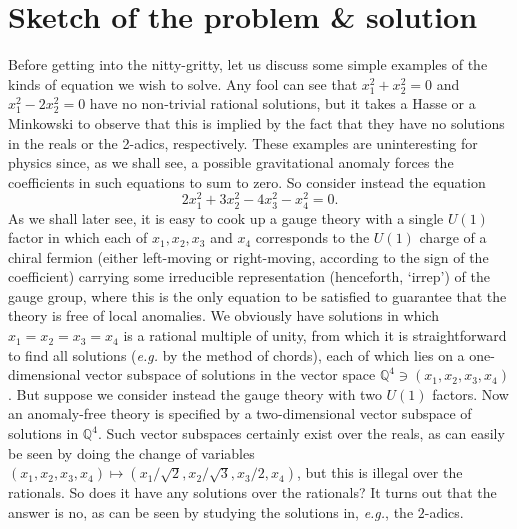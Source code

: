 \documentclass[11pt,a4paper]{article}
\begin{document}
	\section{Sketch of the problem \& solution}\label{section:sketch}
        Before getting into the nitty-gritty, let us discuss some simple examples of the kinds of equation we wish to solve. Any fool can see that $x_1^2 + x_2^2 = 0$ and $x_1^2 - 2x_2^2 = 0$ have no non-trivial rational solutions, but it takes a Hasse or a Minkowski to observe that this is implied by the fact that they have no solutions in the reals or the 2-adics, respectively. These examples are uninteresting for physics since, as we shall see, a possible gravitational anomaly forces the coefficients in such equations to sum to zero. So consider instead the equation
$$2x_1^2+3x_2^2-4x_3^2-x_4^2=0.$$
As we shall later see, it is easy to cook up a gauge theory with a single $U(1)$ factor in which each of $x_1,x_2,x_3$ and $x_4$ corresponds to the $U(1)$ charge of a chiral fermion (either left-moving or right-moving, according to the sign of the coefficient) carrying some irreducible representation (henceforth, `irrep') of the gauge group, where this is the only equation to be satisfied to guarantee that the theory is free of local anomalies. We obviously have solutions in which $x_1=x_2=x_3=x_4$ is a rational multiple of unity, from which it is straightforward to find all solutions ({\em e.g.} by the method of chords), each of which lies on a one-dimensional vector subspace of solutions in the vector space $\mathbb{Q}^4 \ni (x_1,x_2,x_3,x_4)$. But suppose we consider instead the gauge theory with two $U(1)$ factors. Now an anomaly-free theory is specified by a two-dimensional vector subspace of solutions in $\mathbb{Q}^4$. Such vector subspaces certainly exist over the reals, as can easily be seen by doing the change of variables $(x_1,x_2,x_3,x_4) \mapsto (x_1/\sqrt{2},x_2/\sqrt{3},x_3/2,x_4)$, but this is illegal over the rationals. So does it have any solutions over the rationals? It turns out that the answer is no, 
as can be seen by studying the solutions in, {\em e.g.}, the $2$-adics. 
\end{document}
